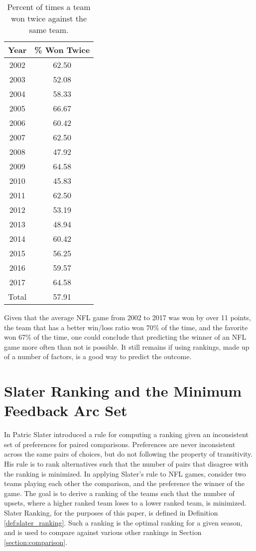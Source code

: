 \documentclass[11pt]{article}
\begin{document}
\begin{table}[!htb]
\begin{center}
\scriptsize
\begin{tabular}{|c|c|}
\hline
Year & \% Won Twice\\
\hline
2002 & 62.50\\
2003 & 52.08\\
2004 & 58.33\\
2005 & 66.67\\
2006 & 60.42\\
2007 & 62.50\\
2008 & 47.92\\
2009 & 64.58\\
2010 & 45.83\\
2011 & 62.50\\
2012 & 53.19\\
2013 & 48.94\\
2014 & 60.42\\
2015 & 56.25\\
2016 & 59.57\\
2017 & 64.58\\
\hline
Total & 57.91\\
\hline
\end{tabular}
\caption{Percent of times a team won twice against the same team.}\label{table:won_twice}
\end{center}
\end{table}

Given that the average NFL game from 2002 to 2017 was won by over 11 points, the team that has a better win/loss ratio won 70\% of the time, and the favorite won 67\% of the time, one could conclude that predicting the winner of an NFL game more often than not is possible. It still remains if using rankings, made up of a number of factors, is a good way to predict the outcome.

\section{Slater Ranking and the Minimum Feedback Arc Set}

In \cite{biometrika_slater} Patric Slater introduced a rule for computing a ranking given an inconsistent set of preferences for paired comparisons. Preferences are never inconsistent across the same pairs of choices, but do not following the property of transitivity. His rule is to rank alternatives such that the number of pairs that disagree with the ranking is minimized. In applying Slater's rule to NFL games, consider two teams playing each other the comparison, and the preference the winner of the game. The goal is to derive a ranking of the teams such that the number of upsets, where a higher ranked team loses to a lower ranked team, is minimized. Slater Ranking, for the purposes of this paper, is defined in Definition \ref{def:slater_ranking}. Such a ranking is the optimal ranking for a given season, and is used to compare against various other rankings in Section \ref{section:comparison}.
\end{document}
